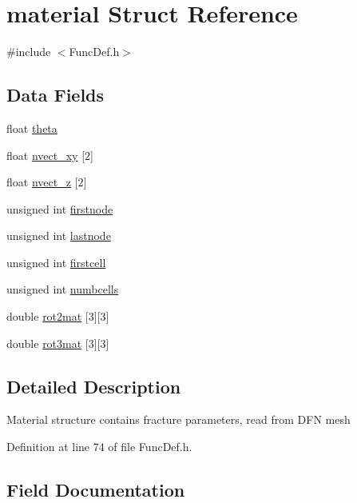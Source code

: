 \hypertarget{structmaterial}{}\section{material Struct Reference}
\label{structmaterial}


{\ttfamily \#include $<$Func\+Def.\+h$>$}

\subsection*{Data Fields}
\begin{DoxyCompactItemize}
\item 
float \mbox{\hyperlink{structmaterial_add2db22d2a9dd5c1c2ec6f14038d43f6}{theta}}
\item 
float \mbox{\hyperlink{structmaterial_a64fad3469b934d7e29be84f2d9b7d7a3}{nvect\+\_\+xy}} \mbox{[}2\mbox{]}
\item 
float \mbox{\hyperlink{structmaterial_aa0a097a3f8fe23d9b3bd41d80cbfacfd}{nvect\+\_\+z}} \mbox{[}2\mbox{]}
\item 
unsigned int \mbox{\hyperlink{structmaterial_a82946cb78555ad8c4c14a12fbd7aa3f8}{firstnode}}
\item 
unsigned int \mbox{\hyperlink{structmaterial_a9bbfaca53483df79578f4ae037867851}{lastnode}}
\item 
unsigned int \mbox{\hyperlink{structmaterial_a528c4eed064175c3377dde7380d17ddc}{firstcell}}
\item 
unsigned int \mbox{\hyperlink{structmaterial_a84365556a52eb9959d6d869dda76433c}{numbcells}}
\item 
double \mbox{\hyperlink{structmaterial_a572b56f5488c560ee0fe118592b660a7}{rot2mat}} \mbox{[}3\mbox{]}\mbox{[}3\mbox{]}
\item 
double \mbox{\hyperlink{structmaterial_a8df25744238b2b814530d49ad58f484d}{rot3mat}} \mbox{[}3\mbox{]}\mbox{[}3\mbox{]}
\end{DoxyCompactItemize}


\subsection{Detailed Description}
Material structure contains fracture parameters, read from D\+FN mesh 

Definition at line 74 of file Func\+Def.\+h.



\subsection{Field Documentation}
\mbox{\label{structmaterial_a528c4eed064175c3377dde7380d17ddc}} 
